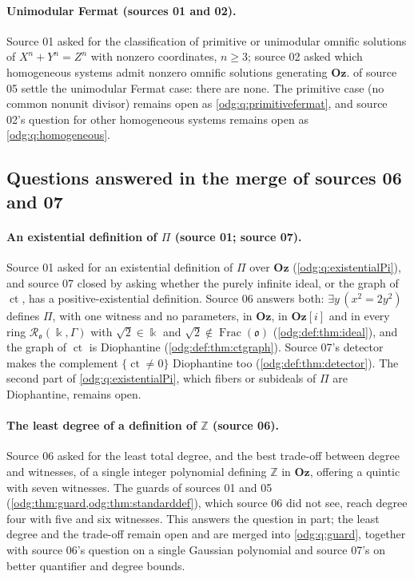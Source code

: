 \documentclass[11pt,oneside]{article}
\numberwithin{equation}{section}
\theoremstyle{definition}
\theoremstyle{remark}
\newcommand{\Oz}{\mathbf{Oz}}
\newcommand{\Z}{\mathbb Z}
\newcommand{\ct}{\operatorname{ct}}
\newcommand{\Frac}{\operatorname{Frac}}
\newcommand{\Og}{\Oz[i]}
\begin{document}
\paragraph{Unimodular Fermat (sources 01 and 02).} Source 01 asked for the
classification of primitive or unimodular omnific solutions of
$X^n+Y^n=Z^n$ with nonzero coordinates, $n\ge3$; source 02 asked which
homogeneous systems admit nonzero omnific solutions generating $\Oz$.
 of source 05 settle the
unimodular Fermat case: there are none. The primitive case (no common nonunit
divisor) remains open as \cref{odg:q:primitivefermat}, and source 02's
question for other homogeneous systems remains open as
\cref{odg:q:homogeneous}.

\subsection{Questions answered in the merge of sources 06 and 07}\label{odg:def:sub:settled}

\paragraph{An existential definition of $\Pi$ (source 01; source 07).} Source
01 asked for an existential definition of $\Pi$ over $\Oz$
(\cref{odg:q:existentialPi}), and source 07 closed by asking whether the purely
infinite ideal, or the graph of $\ct$, has a positive-existential definition.
Source 06 answers both: $\exists y\,(x^2=2y^2)$ defines $\Pi$, with one witness
and no parameters, in $\Oz$, in $\Og$ and in every ring
$\mathcal R_{\mathfrak o}(\Bbbk,\Gamma)$ with $\sqrt2\in\Bbbk$ and
$\sqrt2\notin\Frac(\mathfrak o)$ (\cref{odg:def:thm:ideal}), and the graph of
$\ct$ is Diophantine (\cref{odg:def:thm:ctgraph}). Source 07's detector makes
the complement $\{\ct\ne0\}$ Diophantine too (\cref{odg:def:thm:detector}). The
second part of \cref{odg:q:existentialPi}, which fibers or subideals of $\Pi$
are Diophantine, remains open.

\paragraph{The least degree of a definition of $\Z$ (source 06).} Source 06
asked for the least total degree, and the best trade-off between degree and
witnesses, of a single integer polynomial defining $\Z$ in $\Oz$, offering a
quintic with seven witnesses. The guards of sources 01 and 05
(\cref{odg:thm:guard,odg:thm:standarddef}), which source 06 did not see, reach
degree four with five and six witnesses. This answers the question in part;
the least degree and the trade-off remain open and are merged into
\cref{odg:q:guard}, together with source 06's question on a single Gaussian
polynomial and source 07's on better quantifier and degree bounds.
\end{document}
